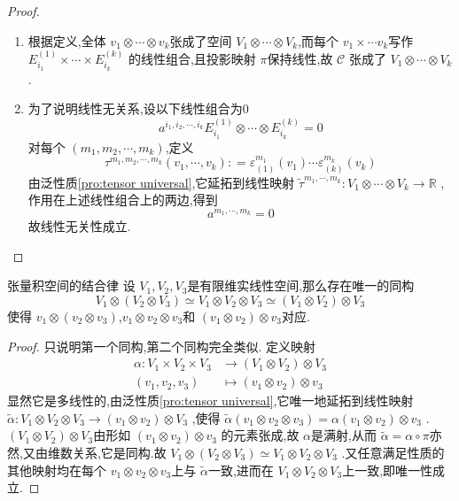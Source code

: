 \documentclass[../../几何与拓扑.tex]{subfiles}
\begin{document}
\begin{proof}
    \begin{enumerate}
        \item 根据定义,全体 $ v_1\otimes \cdots \otimes  v_{k} $张成了空间 $ V_1\otimes \cdots \otimes V_{k} $,而每个 $ v_1\times \cdots v_{k} $写作 $ E_{i_1}^{\left( 1 \right) }\times \cdots \times E_{i_{k}} ^{\left( k \right) }$  的线性组合,且投影映射 $ \pi $保持线性,故 $ \mathscr{C} $  张成了 $ V_1\otimes \cdots \otimes V_{k} $.
        \item 为了说明线性无关系,设以下线性组合为0 $$
        a^{i_1,i_2,\cdots,i_k   } E_{i_{1}  }^{\left( 1 \right) }\otimes \cdots \otimes  E_{i_{k}}^{\left( k \right) }=0
        $$ 对每个 $ \left( m_1,m_2,\cdots,m_k \right)  $,定义 $$
        \tau^{m_1,m_2,\cdots,m_k} \left( v_1,\cdots ,v_{k} \right) : = \varepsilon_{\left( 1 \right) }^{m_1}\left( v_1 \right)\cdots \varepsilon_{\left( k \right) }^{m_{k}} \left( v_{k} \right) 
        $$ 由泛性质\ref{pro:tensor universal},它延拓到线性映射 $ \tilde{\tau} ^{m_1,\cdots ,m_{k}} : V_1\otimes \cdots \otimes V_{k} \to \mathbb{R}  $ ,作用在上述线性组合上的两边,得到 $$
        a^{m_1,\cdots ,m_{k}}=0
        $$故线性无关性成立.
    \end{enumerate}
    
\end{proof}

\begin{proposition}{张量积空间的结合律}
    设 $ V_1,V_2,V_3 $是有限维实线性空间,那么存在唯一的同构 $$
    V_1\otimes \left( V_2\otimes V_3 \right)\simeq V_1\otimes V_2\otimes V_3\simeq \left( V_1\otimes V_2 \right)\otimes V_3  
    $$ 使得 $ v_1\otimes \left( v_2\otimes v_3 \right)  $,$ v_1\otimes v_2\otimes v_3 $和 $ \left( v_1\otimes v_2 \right)\otimes v_3  $对应.   
\end{proposition}

\begin{proof}
    只说明第一个同构,第二个同构完全类似.
    定义映射 $$ \begin{aligned}
        \alpha :V_1\times V_2\times V_3 & \to \left( V_1\otimes V_2 \right)\otimes V_3  \\ 
          \left( v_1,v_2,v_3 \right) & \mapsto \left( v_1\otimes v_2 \right)\otimes v_3 
    \end{aligned} $$显然它是多线性的,由泛性质\ref{pro:tensor universal},它唯一地延拓到线性映射 $ \tilde{\alpha }: V_1\otimes V_2\otimes V_3\to\left( v_1\otimes v_2 \right)\otimes V_3 $ ,使得 $ \tilde{\alpha} \left( v_1\otimes v_2\otimes v_3 \right)= \alpha\left( v_1\otimes v_2 \right)\otimes v_3   $ .
    $ \left( V_1\otimes V_2 \right)\otimes V_3  $由形如 $ \left( v_1\otimes v_2 \right)\otimes v_3  $  的元素张成,故 $ \alpha $是满射,从而 $ \tilde{\alpha}= \alpha\circ \pi $亦然,又由维数关系,它是同构.故 $ V_1\otimes \left( V_2\otimes V_3 \right)\simeq  V_1\otimes V_2\otimes V_3  $   .又任意满足性质的其他映射均在每个 $ v_1\otimes v_2\otimes v_3 $上与 $ \tilde{\alpha} $一致,进而在 $ V_1\otimes V_2\otimes V_3 $上一致,即唯一性成立.    
\end{proof}
\end{document}

